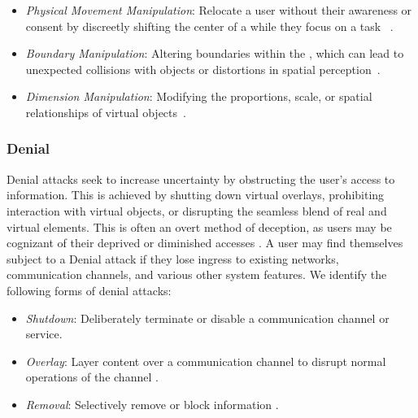      \begin{itemize}
     \itemsep0em
     \item \emph{Physical Movement Manipulation}: Relocate a user without their awareness or consent by discreetly shifting the center of a \VE while they focus on a task%
     ~\cite{Casey_2021}.
     
     \item \emph{Boundary Manipulation}: Altering boundaries within the \VE, which can lead to unexpected collisions with objects or distortions in spatial perception~\cite{schmidt2019blended}.
     
     \item \emph{Dimension Manipulation}: Modifying the proportions, scale, or spatial relationships of virtual objects~\cite{bozgeyikli2021evaluating}.
     \end{itemize} 

\subsubsection{Denial}

Denial attacks seek to increase uncertainty by obstructing the user's access to information. This is achieved by shutting down virtual overlays, prohibiting interaction with virtual objects, or disrupting the seamless blend of real and virtual elements. %
This is often an overt method of deception, as users may be cognizant of their deprived or diminished accesses \cite{kopp2003shannon}. A user may find themselves subject to a Denial attack if they lose ingress to existing networks, communication channels, and various other system features. 
We identify the following forms of denial attacks:
    \begin{itemize}
    \itemsep0em 
    
    \item \emph{Shutdown}: Deliberately terminate or disable a \MR communication channel or service. %
    
    \item \emph{Overlay}: Layer content over a communication channel to disrupt normal operations of the channel \cite{Lee2021AdCube, Roesner2011Security, Tseng_2022}. %
     
    \item \emph{Removal}: Selectively remove or block information \cite{odeleye2021detecting}.
    \end{itemize} 

